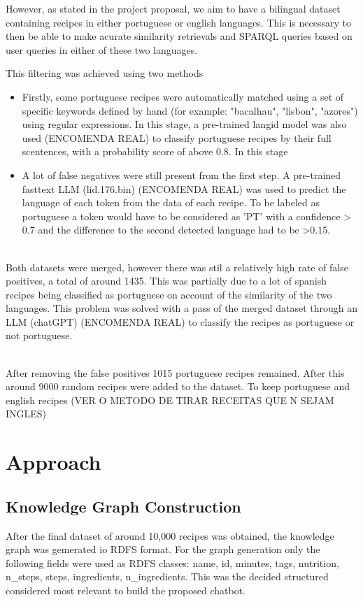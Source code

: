 \documentclass[conference]{IEEEtran}
\begin{document}
\noindent
However, as stated in the project proposal, we aim to have a bilingual dataset containing recipes in either portuguese or english languages. This is necessary to then be able to make acurate similarity retrievals and SPARQL queries based on user queries in either of these two languages.


\noindent
This filtering was achieved using two methods 
\begin{itemize}
  \item Firstly, some portuguese recipes were automatically matched using a set of specific keywords defined by hand (for example: "bacalhau", "lisbon", "azores") using regular expressions. In this stage, a pre-trained langid model was also used (ENCOMENDA REAL) to classify portuguese recipes by their full scentences, with a probability score of above 0.8. In this stage
  \item A lot of false negatives were still present from the first step. A pre-trained fasttext LLM (lid.176.bin) (ENCOMENDA REAL) was used to predict the language of each token from the data of each recipe. To be labeled as portuguese a token would have to be considered as 'PT' with a confidence > 0.7 and the difference to the second detected language had to be >0.15. 
\end{itemize} 

\noindent
\\
Both datasets were merged, however there was stil a relatively high rate of false positives, a total of around 1435. This was partially due to a lot of spanish recipes being classified as portuguese on account of the similarity of the two languages. This problem was solved with a pass of the merged dataset through an LLM (chatGPT) (ENCOMENDA REAL) to classify the recipes as portuguese or not portuguese.

\noindent
\\
After removing the false positives 1015 portuguese recipes remained. After this around 9000 random recipes were added to the dataset. To keep portuguese and english recipes (VER O METODO DE TIRAR RECEITAS QUE N SEJAM INGLES)

\section{Approach}

\subsection{Knowledge Graph Construction}
\noindent
After the final dataset of around 10,000 recipes was obtained, the knowledge graph was gemerated io RDFS format. For the graph generation only the following fields were used as RDFS classes: name, id, minutes, tags, nutrition, n\_steps, steps, ingredients, n\_ingredients. This was the decided structured considered most relevant to build the proposed chatbot.
\end{document}
